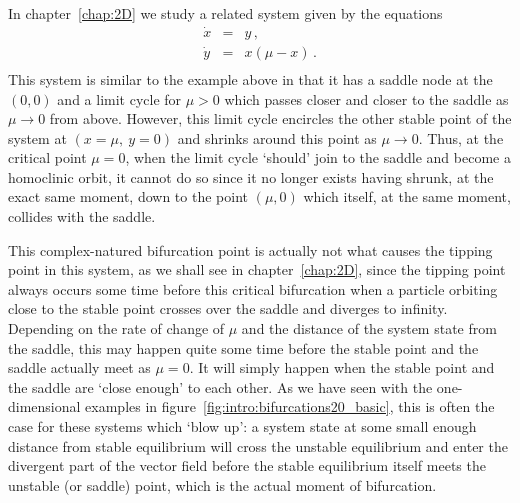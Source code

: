 {{		In chapter~\ref{chap:2D} we study a related system given by the equations
		\begin{equation}
			\begin{array}{rcl}
			\dot{x} &=& y\,,\\
			\dot{y} &=& x(\mu -x)\,. \\
			\end{array}
		\end{equation}
		This system is similar to the example above in that it has a saddle node at the $(0,0)$ and a limit cycle for $\mu>0$ which passes closer and closer to the saddle as $\mu\rightarrow0$ from above. However, this limit cycle encircles the other stable point of the system at $(x=\mu,~y=0)$ and shrinks around this point as $\mu\rightarrow0$. Thus, at the critical point $\mu=0$, when the limit cycle `should' join to the saddle and become a homoclinic orbit, it cannot do so since it no longer exists having shrunk, at the exact same moment, down to the point $(\mu,0)$ which itself, at the same moment, collides with the saddle. 
		
		This complex-natured bifurcation point is actually not what causes the tipping point in this system, as we shall see in chapter~\ref{chap:2D}, since the tipping point always occurs some time before this critical bifurcation when a particle orbiting close to the stable point crosses over the saddle and diverges to infinity. Depending on the rate of change of $\mu$ and the distance of the system state from the saddle, this may happen quite some time before the stable point and the saddle actually meet as $\mu=0$. It will simply happen when the stable point and the saddle are `close enough' to each other. As we have seen with the one-dimensional examples in figure~\ref{fig:intro:bifurcations20_basic}, this is often the case for these systems which `blow up': a system state at some small enough distance from stable equilibrium will cross the unstable equilibrium and enter the divergent part of the vector field before the stable equilibrium itself meets the unstable (or saddle) point, which is the actual moment of bifurcation. 
		
		
}}






